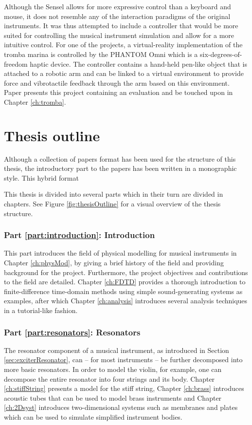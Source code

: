 Although the Sensel allows for more expressive control than a keyboard and mouse, it does not resemble any of the interaction paradigms of the original instruments. It was thus attempted to include a controller that would be more suited for controlling the musical instrument simulation and allow for a more intuitive control.
For one of the projects, a virtual-reality implementation of the tromba marina is controlled by the PHANTOM Omni \cite{phantom} which is a six-degrees-of-freedom haptic device. The controller contains a hand-held pen-like object that is attached to a robotic arm and can be linked to a virtual environment to provide force and vibrotactile feedback through the arm based on this environment. Paper \citeP[E] presents this project containing an evaluation and be touched upon in Chapter \ref{ch:tromba}.

\section{Thesis outline} 
Although a collection of papers format has been used for the structure of this thesis, the introductory part to the papers has been written in a monographic style. This hybrid format  

This thesis is divided into several parts which in their turn are divided in chapters. See Figure \ref{fig:thesisOutline} for a visual overview of the thesis structure. 

\subsubsection{Part \ref{part:introduction}: Introduction}
This part introduces the field of physical modelling for musical instruments in Chapter \ref{ch:physMod}, by giving a brief history of the field and providing background for the project. Furthermore, the project objectives and contributions to the field are detailed. Chapter \ref{ch:FDTD} provides a thorough introduction to finite-difference time-domain methods using simple sound-generating systems as examples, after which Chapter \ref{ch:analysis} introduces several analysis techniques in a tutorial-like fashion.

\subsubsection{Part \ref{part:resonators}: Resonators}
The resonator component of a musical instrument, as introduced in Section \ref{sec:exciterResonator}, can -- for most instruments -- be further decomposed into more basic resonators. In order to model the violin, for example, one can decompose the entire resonator into four strings and its body. Chapter \ref{ch:stiffString} presents a model for the stiff string, Chapter \ref{ch:brass} introduces acoustic tubes that can be used to model brass instruments and Chapter \ref{ch:2Dsyst} introduces two-dimensional systems such as membranes and plates which can be used to simulate simplified instrument bodies.

